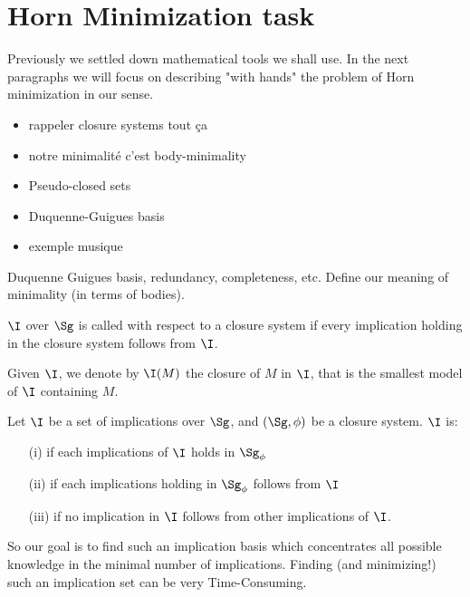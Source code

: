 \section{Horn Minimization task}

Previously we settled down mathematical tools we shall use. In the next 
paragraphs we will focus on describing "with hands" the problem of Horn 
minimization in our sense. 

\begin{itemize}
	\item rappeler closure systems tout ça
	\item notre minimalité c'est body-minimality
	\item Pseudo-closed sets
	\item Duquenne-Guigues basis
	\item exemple musique
\end{itemize}

Duquenne Guigues basis, redundancy, completeness, etc. Define our meaning of
minimality (in terms of bodies). 

\begin{definition} $\I$ over $\Sg$ is called 
	 with respect to a closure system if every implication 
	holding
	in the closure system follows from $\I$.
	
\end{definition}

Given $\I$, we denote by $\I(M)$ the closure of $M$ in $\I$, that is the 
smallest model of $\I$ containing $M$.

\begin{definition} Let $\I$ be a set of 
	implications over $\Sg$, and $(\Sg, \phi)$ be a closure system. $\I$ is:
	\begin{itemize}
		\item[(i)]  if each implications of $\I$ holds in 
		$\Sg_\phi$
		\item[(ii)]  if each implications holding in 
		$\Sg_\phi$ 
		follows from $\I$
		\item[(iii)]  if no implication in $\I$ follows 
		from 
		other implications of $\I$.
	\end{itemize}
	
\end{definition}

So our goal is to find such an implication basis which concentrates all possible
knowledge in the minimal number of implications. Finding (and minimizing!) such
an implication set can be very Time-Consuming.


